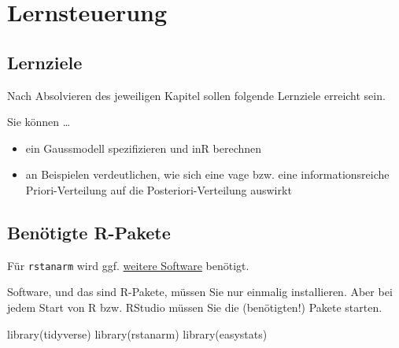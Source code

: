\documentclass[
  a4paper,
  DIV=11]{scrreprt}
\newenvironment{Shaded}{\begin{snugshade}}{\end{snugshade}}
\newcommand{\FunctionTok}[1]{\textcolor[rgb]{0.28,0.35,0.67}{#1}}
\newcommand{\NormalTok}[1]{\textcolor[rgb]{0.00,0.23,0.31}{#1}}
\providecommand{\tightlist}{%
  \setlength{\itemsep}{0pt}\setlength{\parskip}{0pt}}\usepackage{longtable,booktabs,array}
\theoremstyle{definition}
\theoremstyle{remark}
\begin{document}
\hypertarget{lernsteuerung-6}{%
\section{Lernsteuerung}\label{lernsteuerung-6}}

\hypertarget{lernziele-7}{%
\subsection{Lernziele}\label{lernziele-7}}

Nach Absolvieren des jeweiligen Kapitel sollen folgende Lernziele
erreicht sein.

Sie können \ldots{}

\begin{itemize}
\tightlist
\item
  ein Gaussmodell spezifizieren und inR berechnen
\item
  an Beispielen verdeutlichen, wie sich eine vage bzw. eine
  informationsreiche Priori-Verteilung auf die Posteriori-Verteilung
  auswirkt
\end{itemize}

\hypertarget{benuxf6tigte-r-pakete-4}{%
\subsection{Benötigte R-Pakete}\label{benuxf6tigte-r-pakete-4}}

Für \texttt{rstanarm} wird ggf.
\href{https://github.com/stan-dev/rstan/wiki/RStan-Getting-Started}{weitere
Software} benötigt.

\begin{tcolorbox}[enhanced jigsaw, colframe=quarto-callout-note-color-frame, title=\textcolor{quarto-callout-note-color}{\faInfo}\hspace{0.5em}{Hinweis}, breakable, leftrule=.75mm, coltitle=black, toptitle=1mm, bottomrule=.15mm, bottomtitle=1mm, opacityback=0, arc=.35mm, rightrule=.15mm, left=2mm, colbacktitle=quarto-callout-note-color!10!white, opacitybacktitle=0.6, toprule=.15mm, titlerule=0mm, colback=white]
Software, und das sind R-Pakete, müssen Sie nur einmalig installieren.
Aber bei jedem Start von R bzw. RStudio müssen Sie die (benötigten!)
Pakete starten.
\end{tcolorbox}

\begin{Shaded}
\begin{Highlighting}[]
\FunctionTok{library}\NormalTok{(tidyverse)}
\FunctionTok{library}\NormalTok{(rstanarm)}
\FunctionTok{library}\NormalTok{(easystats)}
\end{Highlighting}
\end{Shaded}
\end{document}
